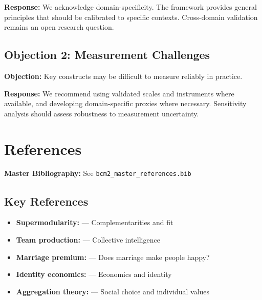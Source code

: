 \textbf{Response:} We acknowledge domain-specificity. The framework provides
general principles that should be calibrated to specific contexts. Cross-domain
validation remains an open research question.

\subsection{Objection 2: Measurement Challenges}

\textbf{Objection:} Key constructs may be difficult to measure reliably in
practice.

\textbf{Response:} We recommend using validated scales and instruments where
available, and developing domain-specific proxies where necessary. Sensitivity
analysis should assess robustness to measurement uncertainty.


\section{References}
\label{sec:let-references}

\begin{tcolorbox}[colback=blue!5!white, colframe=blue!75!black]
\textbf{Master Bibliography:} See \texttt{bcm2\_master\_references.bib}
\end{tcolorbox}

\subsection{Key References}

\begin{itemize}[nosep]
\item \textbf{Supermodularity:} \citet{milgromroberts1995} --- Complementarities and fit
\item \textbf{Team production:} \citet{woolley2010} --- Collective intelligence
\item \textbf{Marriage premium:} \citet{stutzer2006} --- Does marriage make people happy?
\item \textbf{Identity economics:} \citet{akerlof2000} --- Economics and identity
\item \textbf{Aggregation theory:} \citet{arrow1951} --- Social choice and individual values
\end{itemize}

\nocite{bcm_master}




